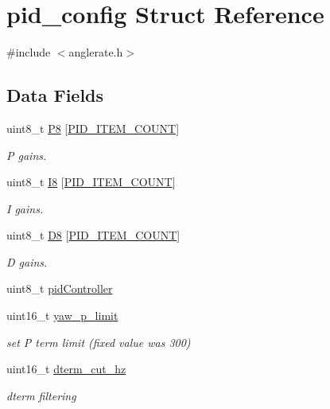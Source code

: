 \hypertarget{structpid__config}{\section{pid\+\_\+config Struct Reference}
\label{structpid__config}
}


{\ttfamily \#include $<$anglerate.\+h$>$}

\subsection*{Data Fields}
\begin{DoxyCompactItemize}
\item 
uint8\+\_\+t \hyperlink{structpid__config_a335799c21d07e812af9b4c50ccb7ccb5}{P8} \mbox{[}\hyperlink{group__anglerate_gga52a0b398dddefa2b6991b6f57e645053ac8bbf1936e503c0af2d12bee3cda3a6e}{P\+I\+D\+\_\+\+I\+T\+E\+M\+\_\+\+C\+O\+U\+N\+T}\mbox{]}
\begin{DoxyCompactList}\small\item\em P gains. \end{DoxyCompactList}\item 
uint8\+\_\+t \hyperlink{structpid__config_afb992939050d08afffe720be88256eaa}{I8} \mbox{[}\hyperlink{group__anglerate_gga52a0b398dddefa2b6991b6f57e645053ac8bbf1936e503c0af2d12bee3cda3a6e}{P\+I\+D\+\_\+\+I\+T\+E\+M\+\_\+\+C\+O\+U\+N\+T}\mbox{]}
\begin{DoxyCompactList}\small\item\em I gains. \end{DoxyCompactList}\item 
uint8\+\_\+t \hyperlink{structpid__config_a331e0c9deffb1365963cd65a3deeb0e0}{D8} \mbox{[}\hyperlink{group__anglerate_gga52a0b398dddefa2b6991b6f57e645053ac8bbf1936e503c0af2d12bee3cda3a6e}{P\+I\+D\+\_\+\+I\+T\+E\+M\+\_\+\+C\+O\+U\+N\+T}\mbox{]}
\begin{DoxyCompactList}\small\item\em D gains. \end{DoxyCompactList}\item 
uint8\+\_\+t \hyperlink{structpid__config_a3f0331946c1a6113244bc307a198f8af}{pid\+Controller}
\item 
uint16\+\_\+t \hyperlink{structpid__config_a429d573cf47312fbe077498489f9ba08}{yaw\+\_\+p\+\_\+limit}
\begin{DoxyCompactList}\small\item\em set P term limit (fixed value was 300) \end{DoxyCompactList}\item 
uint16\+\_\+t \hyperlink{structpid__config_a31d6b30a82800e72d3200d84db1e8dbf}{dterm\+\_\+cut\+\_\+hz}
\begin{DoxyCompactList}\small\item\em dterm filtering \end{DoxyCompactList}\end{DoxyCompactItemize}


